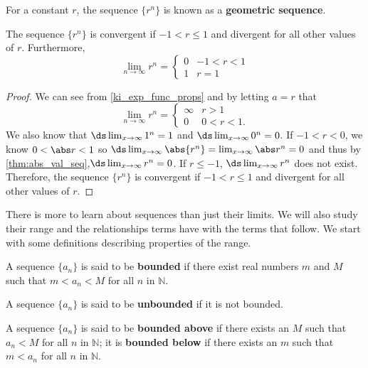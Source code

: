 
\begin{definition}\label{def:geom_seq}%
For a constant $r$, the sequence $\{r^n\}$ is known as a \textbf{geometric sequence}.
\end{definition}

\begin{theorem}\label{thm:geom_seq}%
The sequence $\{r^n\}$ is convergent if $-1<r\leq 1$ and divergent for all other values of $r$.  Furthermore,
\[
\lim_{n\to \infty} r^n=\begin{cases} 
0&  -1<r<1\\
1& r=1
\end{cases}\]
\end{theorem}

\begin{proof}
We can see from \autoref{ki_exp_func_props} and by letting $a=r$ that
\[
\lim_{n\to \infty} r^n =
\begin{cases}
\infty &  r>1\\
0 & 0<r<1.
\end{cases}
\]
We also know that $\ds  \lim_{x\to \infty} 1^n=1$ and $\ds  \lim_{x\to \infty} 0^n=0$. If $-1<r<0$, we know $0<\abs r<1$ so $\ds \lim_{x\to \infty}\abs{r^n}=\lim_{x\to \infty}\abs r^n=0$ and thus by \autoref{thm:abs_val_seq},$\ds \lim_{x\to \infty} r^n=0$. If $r\le-1$, $\ds \lim_{x\to \infty} r^n$ does not exist. Therefore, the sequence $\{ r^n\}$ is convergent if $-1<r\leq 1$ and divergent for all other values of $r$.
\end{proof}



There is more to learn about sequences than just their limits. We will also study their range and the relationships terms have with the terms that follow. We start with some definitions describing properties of the range.

\begin{definition}\label{def:bounded}%
A sequence $\{a_n\}$ is said to be \textbf{bounded} if there exist real numbers $m$ and $M$ such that $m < a_n < M$ for all $n$ in $\mathbb{N}$.\bigskip

A sequence $\{a_n\}$ is said to be \textbf{unbounded} if it is not bounded.\bigskip

A sequence $\{a_n\}$ is said to be \textbf{bounded above} if there exists an $M$ such that $a_n < M$ for all $n$ in $\mathbb{N}$; it is \textbf{bounded below} if there exists an $m$ such that $m<a_n$ for all $n$ in $\mathbb{N}$.
\end{definition}

